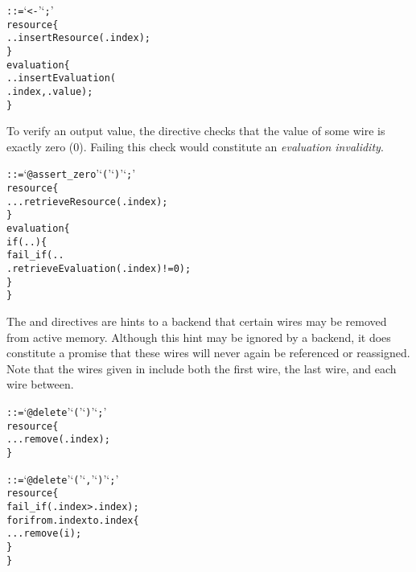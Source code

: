 \begin{alltt}\ttSyn
   ::=  `<-'  `;'\ttSem
  resource \{
    ..insertResource(.index);
  \}
  evaluation \{
    ..insertEvaluation(
      .index, .value);
  \}
\end{alltt}

To verify an output value, the  directive checks that the value of some wire is exactly zero (0).
Failing this check would constitute an \textit{evaluation invalidity}.\\

\begin{alltt}\ttSyn
   ::= `@assert_zero' `('  `)' `;'\ttSem
  resource \{
    ...retrieveResource(.index);
  \}
  evaluation \{
    if(..) \{
      fail_if(..
        .retrieveEvaluation(.index) != 0);
    \}
  \}
\end{alltt}

The  and  directives are hints to a backend that certain wires may be removed from active memory.
Although this hint may be ignored by a backend, it does constitute a promise that these wires will never again be referenced or reassigned.
Note that the wires given in  include both the first wire, the last wire, and each wire between.\\

\begin{alltt}\ttSyn
   ::= `@delete' `('  `)' `;'\ttSem
  resource \{
    ...remove(.index);
  \}\ttSyn

   ::= `@delete' `('  `,'  `)' `;'\ttSem
  resource \{
    fail_if(.index > .index);
    for i from .index to .index \{
      ...remove(i);
    \}
  \}
\end{alltt}

